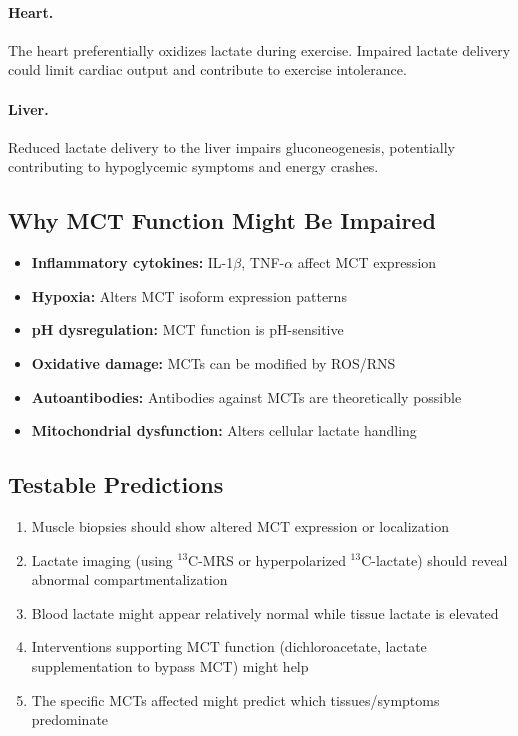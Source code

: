 \paragraph{Heart.} The heart preferentially oxidizes lactate during exercise. Impaired lactate delivery could limit cardiac output and contribute to exercise intolerance.

\paragraph{Liver.} Reduced lactate delivery to the liver impairs gluconeogenesis, potentially contributing to hypoglycemic symptoms and energy crashes.

\subsection{Why MCT Function Might Be Impaired}

\begin{itemize}
    \item \textbf{Inflammatory cytokines:} IL-1$\beta$, TNF-$\alpha$ affect MCT expression
    \item \textbf{Hypoxia:} Alters MCT isoform expression patterns
    \item \textbf{pH dysregulation:} MCT function is pH-sensitive
    \item \textbf{Oxidative damage:} MCTs can be modified by ROS/RNS
    \item \textbf{Autoantibodies:} Antibodies against MCTs are theoretically possible
    \item \textbf{Mitochondrial dysfunction:} Alters cellular lactate handling
\end{itemize}

\subsection{Testable Predictions}

\begin{enumerate}
    \item Muscle biopsies should show altered MCT expression or localization
    \item Lactate imaging (using $^{13}$C-MRS or hyperpolarized $^{13}$C-lactate) should reveal abnormal compartmentalization
    \item Blood lactate might appear relatively normal while tissue lactate is elevated
    \item Interventions supporting MCT function (dichloroacetate, lactate supplementation to bypass MCT) might help
    \item The specific MCTs affected might predict which tissues/symptoms predominate
\end{enumerate}


